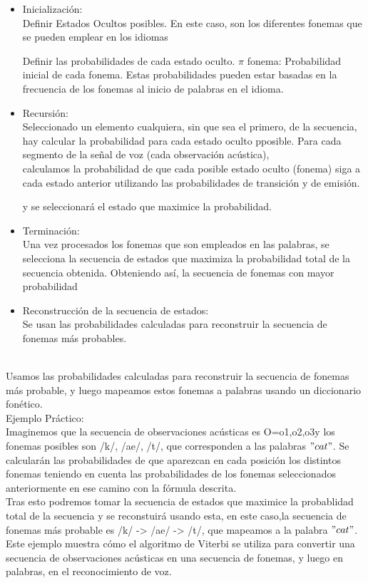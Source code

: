 \documentclass[11pt,openany]{book}
\begin{document}
\begin{itemize}
      \item Inicialización: \\ 
      Definir Estados Ocultos posibles. En este caso, son los diferentes fonemas que se pueden emplear en los idiomas
      
      Definir las probabilidades de cada estado oculto. $\pi$ fonema: Probabilidad inicial de cada fonema. Estas probabilidades pueden estar basadas en la frecuencia de los fonemas al inicio de palabras en el idioma.
      \item Recursión: \\
      Seleccionado un elemento cualquiera, sin que sea el primero, de la secuencia, hay calcular la probabilidad para cada estado oculto pposible. Para cada segmento de la señal de voz (cada observación acústica), \\
      calculamos la probabilidad de que cada posible estado oculto (fonema) siga a cada estado anterior utilizando las probabilidades de transición y de emisión.


      y se seleccionará el estado que maximice la probabilidad.
      \item Terminación: \\
      Una vez procesados los fonemas que son empleados en las palabras, se selecciona la secuencia de estados que maximiza la probabilidad total de la secuencia obtenida. Obteniendo así, la secuencia de fonemas con mayor probabilidad
      
      \item Reconstrucción de la secuencia de estados: \\
      Se usan las probabilidades calculadas para reconstruir la secuencia de fonemas más probables. \\ \\
\end{itemize}
Usamos las probabilidades calculadas para reconstruir la secuencia de fonemas más probable, y luego mapeamos estos fonemas a palabras usando un diccionario fonético. \\
Ejemplo Práctico: \\
Imaginemos que la secuencia de observaciones acústicas es O={o1,o2,o3}y los fonemas posibles son /k/, /ae/, /t/, que corresponden a las palabras $"cat"$.
Se calcularán las probabilidades de que aparezcan en cada posición los distintos fonemas teniendo en cuenta las probabilidades de los fonemas seleccionados anteriormente en ese camino con la fórmula descrita. \\
Tras esto podremos tomar la secuencia de estados que maximice la probablidad total de la secuencia y se reconstuirá usando esta, en este caso,la secuencia de fonemas más probable es /k/ -> /ae/ -> /t/, que mapeamos a la palabra $"cat"$. \\
Este ejemplo muestra cómo el algoritmo de Viterbi se utiliza para convertir una secuencia de observaciones acústicas en una secuencia de fonemas, y luego en palabras, en el reconocimiento de voz.
\end{document}
